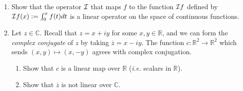 \begin{enumerate}

  
\item Show that the operator ${\cal I}$ that maps $f$ to the function ${\cal I}f$ defined by ${\cal I}f(x):=\int_0^xf(t)dt$ is a linear operator on the space of continuous functions. 



\item Let $z \in \mathbb{C}$. Recall that  $z = x + iy$ for some $x,y \in \mathbb{R}$, and we can form the \emph{complex conjugate} of $z$ by taking $\overline{z} = x - iy$. 
The function $c \colon \mathbb{R}^2 \rightarrow \mathbb{R}^2$ which sends $(x, y) \mapsto (x, -y)$ agrees with complex conjugation.
\begin{enumerate}
\item Show that $c$ is a linear map over $\mathbb{R}$ ({\it i.e.} scalars in $\mathbb{R}$).

\item Show that $\overline{z}$ is not linear over $\mathbb{C}$.
\end{enumerate}

\end{enumerate}


